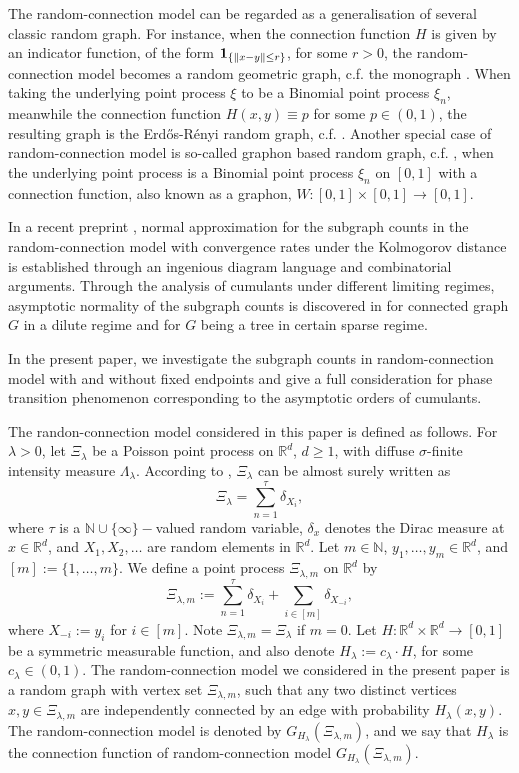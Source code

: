 \documentclass[12pt]{article}
\newcommand{\R}{\mathbb{R}}
\newcommand{\bone}{{\bf 1}}
\newcommand{\N}{\mathbb{N}}
\def\N{{\mathord{\mathbb N}}}
\numberwithin{equation}{section}
\begin{document}
The random-connection model can be regarded as a generalisation of several classic random graph. For instance, when the connection function $H$ is given by an indicator function, of the form $\bone_{\{\|x-y\|\le r\}}$, for some $r>0$, the random-connection model becomes a random geometric graph, c.f. the monograph \cite{penrosebk}. When taking the underlying point process $\xi$ to be a Binomial point process $\xi_n$, meanwhile the connection function $H(x,y)\equiv p$ for some $p\in(0,1)$, the resulting graph is the Erd{\H o}s-R\'enyi random graph, c.f. \cite{gilbert59,ER}. Another special case of random-connection model is so-called graphon based random graph, c.f. \cite{zhang22,bhattacharya23}, when the underlying point process is a Binomial point process $\xi_n$ on $[0,1]$ with a connection function, also known as a graphon, $W:[0,1]\times[0,1]\to[0,1]$.

In a recent preprint \cite{LiuPrivault23a}, normal approximation for the subgraph counts in the random-connection model with convergence rates under the Kolmogorov distance is established through an ingenious diagram language and combinatorial arguments. Through the analysis of cumulants under different limiting regimes, asymptotic normality of the subgraph counts is discovered in \cite{LiuPrivault23a} for connected graph $G$ in a dilute regime and for $G$ being a tree in certain sparse regime. 

In the present paper, we investigate the subgraph counts in random-connection model with and without fixed endpoints and give a full consideration for phase transition phenomenon corresponding to the asymptotic orders of cumulants. 

The randon-connection model considered in this paper is defined as follows. For $\lambda > 0$, let $\Xi_\lambda$ be a Poisson point process on $\R^d$, $d\geq 1$, with diffuse $\sigma$-finite intensity measure $\Lambda_\lambda$. According to \cite[Corollary~6.5]{LastPenrose17}, $\Xi_\lambda$ can be almost surely written as 
$$\Xi_\lambda=\sum_{n=1}^\tau\delta_{X_i},$$
where $\tau$ is a $\N\cup\{\infty\}-$valued random variable, $\delta_x$ denotes the Dirac measure at $x\in\R^d$, and $X_1,X_2,\dots$ are random elements in $\R^d$. Let $m\in\N$, $y_1,\dots,y_m\in\R^d$, and $[m]:=\{1,\dots,m\}$. We define a point process $\Xi_{\lambda,m}$ on $\R^d$ by 
$$\Xi_{\lambda,m}:=\sum_{n=1}^\tau\delta_{X_i}+\sum_{i\in[m]}\delta_{X_{-i}},$$
where $X_{-i}:=y_i$ for $i\in [m]$. Note $\Xi_{\lambda,m}=\Xi_\lambda$ if $m=0$. Let $H:\R^d\times \R^d\to [0,1]$ be a symmetric measurable function, and also denote $H_\lambda:=c_\lambda\cdot H$, for some $c_\lambda\in(0,1)$. The random-connection model we considered in the present paper is a random graph with vertex set $\Xi_{\lambda,m}$, such that any two distinct vertices $x,y\in\Xi_{\lambda,m}$ are independently connected by an edge with probability $H_\lambda(x,y)$. The random-connection model is denoted by $G_{H_\lambda}(\Xi_{\lambda,m})$, and we say that $H_\lambda$ is the connection function of random-connection model $G_{H_\lambda}(\Xi_{\lambda,m})$.
\end{document}
